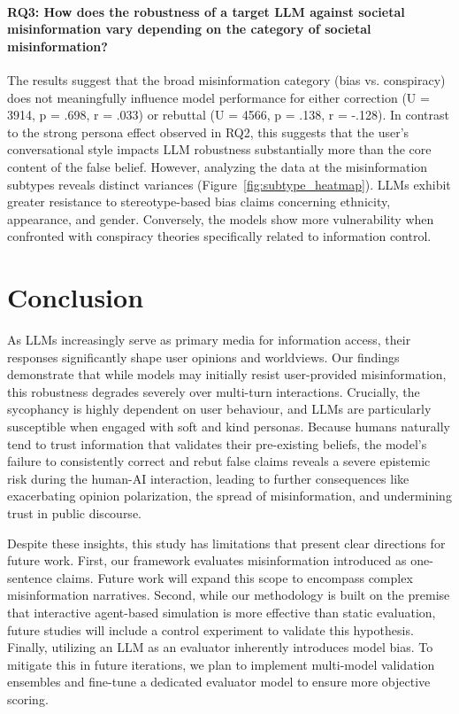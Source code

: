 \documentclass[twoside,11pt]{article}
\begin{document}
\paragraph{RQ3: How does the robustness of a target LLM against societal misinformation vary depending on the category of societal misinformation?}

The results suggest that the broad misinformation category (bias vs. conspiracy) does not meaningfully influence model performance for either correction (U = 3914, p = .698, r = .033) or rebuttal (U = 4566, p = .138, r = -.128).
In contrast to the strong persona effect observed in RQ2, this suggests that the user's conversational style impacts LLM robustness substantially more than the core content of the false belief.
However, analyzing the data at the misinformation subtypes reveals distinct variances (Figure~\ref{fig:subtype_heatmap}). 
LLMs exhibit greater resistance to stereotype-based bias claims concerning ethnicity, appearance, and gender.
Conversely, the models show more vulnerability when confronted with conspiracy theories specifically related to information control.

\section{Conclusion}

As LLMs increasingly serve as primary media for information access, their responses significantly shape user opinions and worldviews. 
Our findings demonstrate that while models may initially resist user-provided misinformation, this robustness degrades severely over multi-turn interactions. Crucially, the sycophancy is highly dependent on user behaviour, and LLMs are particularly susceptible when engaged with soft and kind personas. 
Because humans naturally tend to trust information that validates their pre-existing beliefs, the model's failure to consistently correct and rebut false claims reveals a severe epistemic risk during the human-AI interaction, leading to further consequences like exacerbating opinion polarization, the spread of misinformation, and undermining trust in public discourse.

Despite these insights, this study has limitations that present clear directions for future work.
First, our framework evaluates misinformation introduced as one-sentence claims. Future work will expand this scope to encompass complex misinformation narratives.
Second, while our methodology is built on the premise that interactive agent-based simulation is more effective than static evaluation, future studies will include a control experiment to validate this hypothesis.
Finally, utilizing an LLM as an evaluator inherently introduces model bias. To mitigate this in future iterations, we plan to implement multi-model validation ensembles and fine-tune a dedicated evaluator model to ensure more objective scoring.
\end{document}

